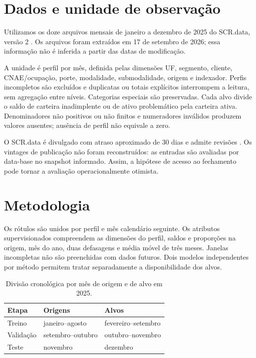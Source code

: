 \documentclass[12pt]{article}
\begin{document}
\section{Dados e unidade de observação}
Utilizamos os doze arquivos mensais de janeiro a dezembro de 2025 do SCR.data,
versão 2 \cite{bcb}. Os arquivos foram extraídos em 17 de setembro de 2026; essa informação não é inferida a partir das datas de
modificação. 

A unidade é perfil por mês, definida pelas dimensões UF, segmento, cliente,
CNAE/ocupação, porte, modalidade, submodalidade, origem e indexador. Perfis
incompletos são excluídos e duplicatas ou totais explícitos interrompem a
leitura, sem agregação entre níveis. Categorias especiais são preservadas.
Cada alvo divide o saldo de carteira inadimplente ou de ativo problemático
pela carteira ativa. Denominadores não positivos ou não finitos e numeradores
inválidos produzem valores ausentes; ausência de perfil não equivale a zero.

O SCR.data é divulgado com atraso aproximado de 30 dias e admite revisões
\cite{bcbmet}. Os vintages de publicação não foram reconstruídos: as entradas
são avaliadas por data-base no snapshot informado. Assim, a hipótese de acesso
ao fechamento pode tornar a avaliação operacionalmente otimista.

\section{Metodologia}
Os rótulos são unidos por perfil e mês calendário seguinte. Os atributos
supervisionados compreendem as dimensões do perfil, saldos e proporções na
origem, mês do ano, duas defasagens e média móvel de três meses. Janelas
incompletas não são preenchidas com dados futuros. Dois modelos independentes
por método permitem tratar separadamente a disponibilidade dos alvos.

\begin{table}[ht]
\centering
\caption{Divisão cronológica por mês de origem e de alvo em 2025.}
\label{tab:protocol}
\begin{tabular}{lll}
\hline
Etapa & Origens & Alvos \\
\hline
Treino & janeiro--agosto & fevereiro--setembro \\
Validação & setembro--outubro & outubro--novembro \\
Teste & novembro & dezembro \\
\hline
\end{tabular}
\end{table}
\end{document}
